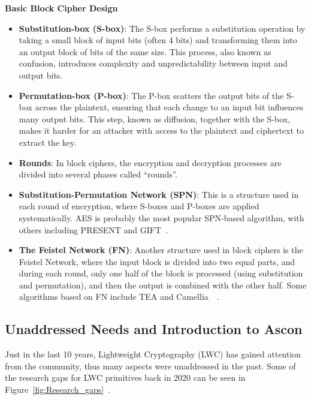 \textbf{Basic Block Cipher Design}
\begin{itemize}
    \item \textbf{Substitution-box (S-box)}: The S-box performs a substitution operation by taking a small block of input bits (often 4 bits) and transforming them into an output block of bits of the same size. This process, also known as confusion, introduces complexity and unpredictability between input and output bits.
    \item \textbf{Permutation-box (P-box)}: The P-box scatters the output bits of the S-box across the plaintext, ensuring that each change to an input bit influences many output bits. This step, known as diffusion, together with the S-box, makes it harder for an attacker with access to the plaintext and ciphertext to extract the key.
    \item \textbf{Rounds}: In block ciphers, the encryption and decryption processes are divided into several phases called ``rounds''.
    \item \textbf{Substitution-Permutation Network (SPN)}: This is a structure used in each round of encryption, where S-boxes and P-boxes are applied systematically. AES is probably the most popular SPN-based algorithm, with others including PRESENT and GIFT~.
    \item \textbf{The Feistel Network (FN)}: Another structure used in block ciphers is the Feistel Network, where the input block is divided into two equal parts, and during each round, only one half of the block is processed (using substitution and permutation), and then the output is combined with the other half. Some algorithms based on FN include TEA and Camellia~\cite{ekwueme2024lightweight}~\cite{chauhan2022analysis}.
\end{itemize}



\subsection{Unaddressed Needs and Introduction to Ascon}

Just in the last 10 years, Lightweight Cryptography (LWC) has gained attention from the community, thus many aspects were unaddressed in the past. Some of the research gaps for LWC primitives back in 2020 can be seen in Figure~\ref{fig:Research_gaps}~\cite{dhanda2020lightweight}.

